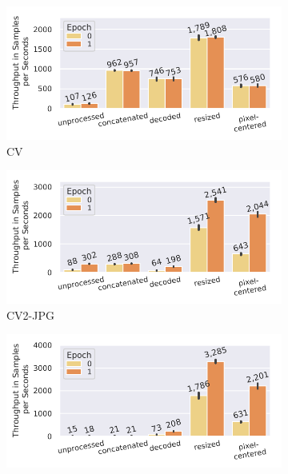 {%
\begin{figure}[h]
    \begin{subfigure}[c]{0.22\textwidth}
        \includegraphics[width=\textwidth]{figures/imagenet-pipeline/caching-over-epochs.pdf}
        \vspace{-18pt}
        \caption{CV}
        \label{fig:caching-cv}
    \end{subfigure}
    \begin{subfigure}[c]{0.22\textwidth}
        \includegraphics[width=\textwidth]{figures/cubeplusplus-jpg-pipeline/caching-over-epochs.pdf}
        \vspace{-18pt}
        \caption{CV2-JPG}
        \label{fig:caching-cv2-jpg}
    \end{subfigure}
    \begin{subfigure}[c]{0.22\textwidth}
        \includegraphics[width=\textwidth]{figures/cubeplusplus-png-pipeline/caching-over-epochs.pdf}

\end{subfigure}
\end{figure}}
